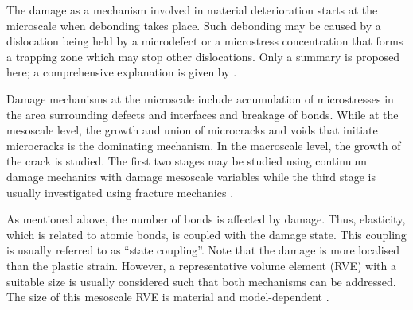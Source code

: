 The damage as a mechanism involved in material deterioration starts at the microscale when debonding takes place. Such debonding may be caused by a dislocation being held by a microdefect or a microstress concentration that forms a trapping zone which may stop other dislocations. Only a summary is proposed here; a comprehensive explanation is given by \parencite{lemaitre2005engineering,lemaitre1996course}.

Damage mechanisms at the microscale include accumulation of microstresses in the area surrounding defects and interfaces and breakage of bonds. While at the mesoscale level, the growth and union of microcracks and voids that initiate microcracks is the dominating mechanism. In the macroscale level, the growth of the crack is studied. The first two stages may be studied using continuum damage mechanics with damage mesoscale variables while the third stage is usually investigated using fracture mechanics \parencite{lemaitre1996course}.

As mentioned above, the number of bonds is affected by damage. Thus, elasticity, which is related to atomic bonds, is coupled with the damage state. This coupling is usually referred to as ``state coupling''. Note that the damage is more localised than the plastic strain. However, a representative volume element (RVE) with a suitable size is usually considered such that both mechanisms can be addressed. The size of this mesoscale RVE is material and model-dependent \parencite{lemaitre1996course}.

